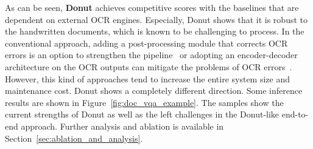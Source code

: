 \documentclass[runningheads]{llncs}
\newcommand\ours{{{\mbox{Donut}}}\xspace}
\newcommand\oursb{{\textbf{\mbox{Donut}}}\xspace}
\begin{document}
As can be seen, \oursb achieves competitive scores with the baselines that are dependent on external OCR engines. Especially, \ours shows that it is robust to the handwritten documents, which is known to be challenging to process. In the conventional approach, adding a post-processing module that corrects OCR errors is an option to strengthen the pipeline~\cite{schaefer-neudecker-2020-two,rijhwani-etal-2020-ocr,duong-etal-2021-unsupervised} or adopting an encoder-decoder architecture on the OCR outputs can mitigate the problems of OCR errors~\cite{hwang2021costeffective}. However, this kind of approaches tend to increase the entire system size and maintenance cost. \ours shows a completely different direction.
Some inference results are shown in Figure~\ref{fig:doc_vqa_example}. The samples show the current strengths of \ours as well as the left challenges in the \ours-like end-to-end approach. Further analysis and ablation is available in Section~\ref{sec:ablation_and_analysis}.
\end{document}
